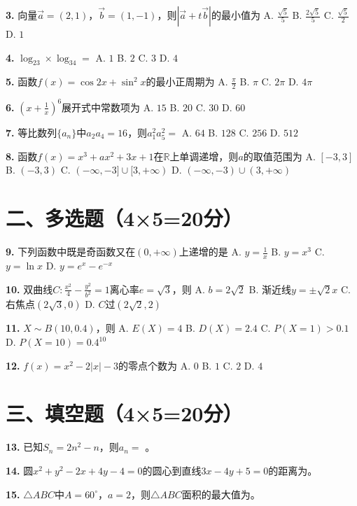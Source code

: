 \documentclass[12pt,a4paper]{ctexart}
\begin{document}
\textbf{3.} 向量$\vec{a}=(2,1)$，$\vec{b}=(1,-1)$，则$|\vec{a}+t\vec{b}|$的最小值为
A. $\frac{\sqrt5}{5}$ \quad B. $\frac{2\sqrt5}{5}$ \quad C. $\frac{\sqrt5}{2}$ \quad D. $1$

\textbf{4.} $\log_23\times\log_34=$
A. $1$ \quad B. $2$ \quad C. $3$ \quad D. $4$

\textbf{5.} 函数$f(x)=\cos2x+\sin^2x$的最小正周期为
A. $\frac{\pi}{2}$ \quad B. $\pi$ \quad C. $2\pi$ \quad D. $4\pi$

\textbf{6.} $(x+\frac1x)^6$展开式中常数项为
A. $15$ \quad B. $20$ \quad C. $30$ \quad D. $60$

\textbf{7.} 等比数列$\{a_n\}$中$a_2a_4=16$，则$a_1^2a_5^2=$
A. $64$ \quad B. $128$ \quad C. $256$ \quad D. $512$

\textbf{8.} 函数$f(x)=x^3+ax^2+3x+1$在$\mathbb{R}$上单调递增，则$a$的取值范围为
A. $[-3,3]$ \quad B. $(-3,3)$ \quad C. $(-\infty,-3]\cup[3,+\infty)$ \quad D. $(-\infty,-3)\cup(3,+\infty)$

\section*{二、多选题（4×5=20分）}

\textbf{9.} 下列函数中既是奇函数又在$(0,+\infty)$上递增的是
A. $y=\frac1x$ \quad B. $y=x^3$ \quad C. $y=\ln x$ \quad D. $y=e^x-e^{-x}$

\textbf{10.} 双曲线$C:\frac{x^2}{4}-\frac{y^2}{b^2}=1$离心率$e=\sqrt3$，则
A. $b=2\sqrt2$ \quad B. 渐近线$y=\pm\sqrt2x$ \quad C. 右焦点$(2\sqrt3,0)$ \quad D. $C$过$(2\sqrt2,2)$

\textbf{11.} $X\sim B(10,0.4)$，则
A. $E(X)=4$ \quad B. $D(X)=2.4$ \quad C. $P(X=1)>0.1$ \quad D. $P(X=10)=0.4^{10}$

\textbf{12.} $f(x)=x^2-2|x|-3$的零点个数为
A. $0$ \quad B. $1$ \quad C. $2$ \quad D. $4$

\section*{三、填空题（4×5=20分）}

\textbf{13.} 已知$S_n=2n^2-n$，则$a_n=$ \underline{\hspace{2cm}}。

\textbf{14.} 圆$x^2+y^2-2x+4y-4=0$的圆心到直线$3x-4y+5=0$的距离为\underline{\hspace{2cm}}。

\textbf{15.} $\triangle ABC$中$A=60^\circ$，$a=2$，则$\triangle ABC$面积的最大值为\underline{\hspace{2cm}}。
\end{document}
